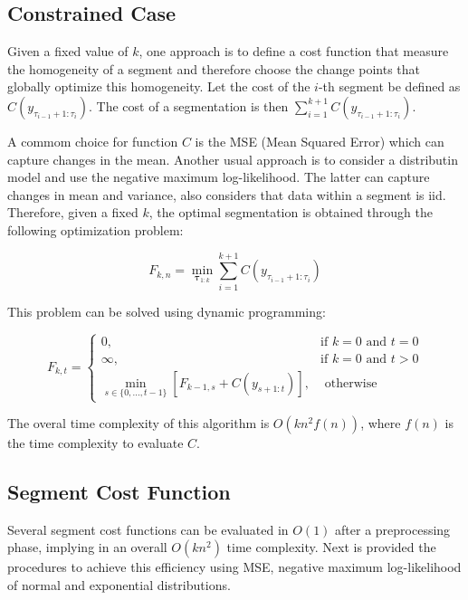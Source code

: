 \subsection{Constrained Case}

Given a fixed value of $k$, one approach is to define a cost function that measure the homogeneity of a segment and therefore choose the change points that globally optimize this homogeneity. Let the cost of the $i$-th segment be defined as $C(y_{\tau_{i - 1} + 1 : \tau_{i}})$. The cost of a segmentation is then $\sum \limits_{i = 1}^{k + 1} C(y_{\tau_{i - 1} + 1 : \tau_{i}})$.

A commom choice for function $C$ is the MSE (Mean Squared Error) which can capture changes in the mean. Another usual approach is to consider a distributin model and use the negative maximum log-likelihood. The latter can capture changes in mean and variance, also considers that data within a segment is iid. Therefore, given a fixed $k$, the optimal segmentation is obtained through the following optimization problem: 

\begin{equation}
    F_{k, n} = \min_{\boldsymbol \tau_{1 : k}} \sum \limits_{i = 1}^{k + 1} C(y_{\tau_{i - 1} + 1 : \tau_{i}})
\end{equation}

This problem can be solved using dynamic programming:

\begin{equation}
    F_{k, t} = 
    \begin{cases}
        0, & \text{if } k = 0 \text{ and } t = 0 \\
        \infty, & \text{if } k = 0 \text{ and } t > 0 \\
        \displaystyle \min_{s \in \{0, ..., t - 1\}} \left[ F_{k - 1, s} + C(y_{s + 1 : t}) \right], & \text{ otherwise}
    \end{cases}
\end{equation}

The overal time complexity of this algorithm is $O(k n^2 f(n))$, where $f(n)$ is the time complexity to evaluate $C$.

\subsection{Segment Cost Function}

Several segment cost functions can be evaluated in $O(1)$ after a preprocessing phase, implying in an overall $O(k n^2)$ time complexity. Next is provided the procedures to achieve this efficiency using MSE, negative maximum log-likelihood of normal and exponential distributions.

